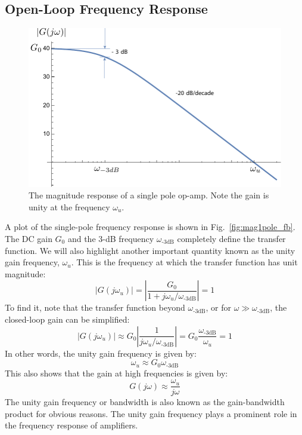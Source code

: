 \subsection{Open-Loop Frequency Response}
\begin{figure}[tb]
\centering
\includegraphics[width=.7\columnwidth]{mag1pole}
\caption{The magnitude response of a single pole op-amp.  Note the gain is unity at the frequency $\omega_u$.}
\label{fig:mag1pole}
\end{figure}
A plot of the single-pole frequency response is shown in Fig.~\ref{fig:mag1pole_fb}.  The DC gain $G_0$ and the 3-dB frequency $\omega_{\text{-3dB}}$ completely define the transfer function.  We will also highlight another important quantity known as the unity gain frequency, $\omega_u$.  This is the frequency at which the transfer function has unit magnitude:
    \begin{equation}
        |G(j\omega_u )| = \left| \frac{G_0}{1 + j\omega_u/\omega_{\text{-3dB}}} \right| = 1
    \end{equation}
To find it, note that the transfer function beyond $\omega_{\text{-3dB}}$, or for $\omega \gg \omega_{\text{-3dB}}$, the closed-loop gain can be simplified:
    \begin{equation}
        |G(j\omega_u )| \approx G_0 \left| \frac{1}{j\omega_u/\omega_{\text{-3dB}}} \right| = G_0 \frac{\omega_{\text{-3dB}}}{\omega_u} = 1 
    \end{equation}
In other words, the unity gain frequency is given by:
    \begin{equation}
        \omega_u \approx G_0 \omega_{\text{-3dB}}
    \end{equation}  
This also shows that the gain at high frequencies is given by:
    \begin{equation}
        G(j\omega ) \approx \frac{{{\omega_u}}}{{j\omega }}
    \end{equation}
The unity gain frequency or bandwidth is also known as the gain-bandwidth product for obvious reasons.   The unity gain frequency plays a prominent role in the frequency response of amplifiers.
